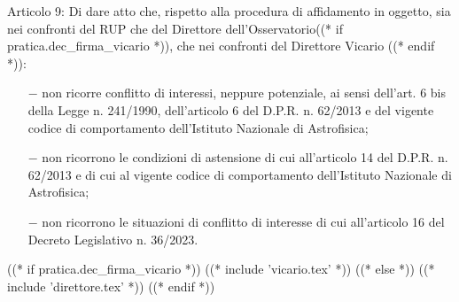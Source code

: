Articolo 9: Di dare atto che, rispetto alla procedura di affidamento in
oggetto, sia nei confronti del RUP che del Direttore
dell'Osservatorio((* if pratica.dec_firma_vicario *)), che nei confronti del Direttore Vicario ((* endif *)):

\begin{itemize}

\item[$-$]  non ricorre conflitto di interessi, neppure potenziale, ai
sensi dell'art. 6 bis della Legge n. 241/1990, dell'articolo 6 del
D.P.R. n. 62/2013 e del vigente codice di comportamento dell'Istituto
Nazionale di Astrofisica;

\item[$-$]  non ricorrono le condizioni di astensione di cui
all'articolo 14 del D.P.R. n. 62/2013 e di cui al vigente codice di
comportamento dell'Istituto Nazionale di Astrofisica;

\item[$-$] non ricorrono le situazioni di conflitto di interesse di cui
all'articolo 16 del Decreto Legislativo n. 36/2023.

\end{itemize}

((* if pratica.dec_firma_vicario *))
((* include 'vicario.tex' *))
((* else *))
((* include 'direttore.tex' *))
((* endif *))

